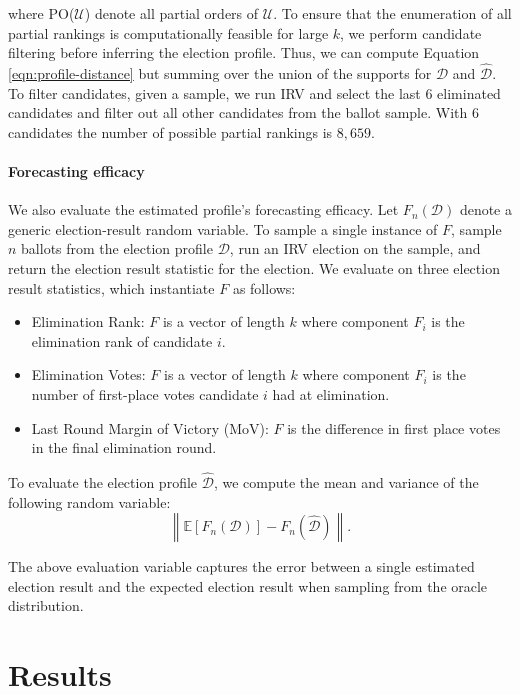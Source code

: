\documentclass{article}
\begin{document}
where PO($\mathcal{U}$) denote all partial orders of $\mathcal{U}$. To ensure that the enumeration of all partial rankings is computationally feasible for large $k$, we perform candidate filtering before inferring the election profile. Thus, we can compute Equation \ref{eqn:profile-distance} but summing over the union of the supports for $\mathcal{D}$ and $\hat{\mathcal{D}}$. To filter candidates, given a sample, we run IRV and select the last $6$ eliminated candidates and filter out all other candidates from the ballot sample. With $6$ candidates the number of possible partial rankings is $8,659$.

\paragraph{Forecasting efficacy}
We also evaluate the estimated profile's forecasting efficacy. Let $F_n(\mathcal{D})$ denote a generic election-result random variable. To sample a single instance of $F$, sample $n$ ballots from the election profile $\mathcal{D}$, run an IRV election on the sample, and return the election result statistic for the election. We evaluate on three election result statistics, which instantiate $F$ as follows:
\begin{itemize}
    \item Elimination Rank: $F$ is a vector of length $k$ where component $F_i$ is the elimination rank of candidate $i$.
    \item Elimination Votes: $F$ is a vector of length $k$ where component $F_i$ is the number of first-place votes candidate $i$ had at elimination.
    \item Last Round Margin of Victory (MoV): $F$ is the difference in first place votes in the final elimination round.
\end{itemize}

To evaluate the election profile $\hat{\mathcal{D}}$, we compute the mean and variance of the following random variable:
\begin{equation} \label{eqn:outcome-error}
    \left\| \mathbb{E}\left[F_n(\mathcal{D})\right] - F_n(\hat{\mathcal{D}}) \right\|.
\end{equation}

The above evaluation variable captures the error between a single estimated election result and the expected election result when sampling from the oracle distribution.

\section{Results}
\end{document}
